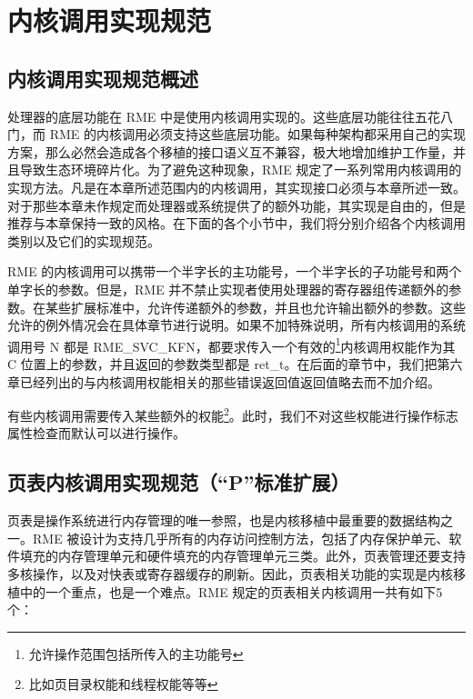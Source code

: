 \chapter{内核调用实现规范}\label{ch:kernel-call-implementation-specification}

\section{内核调用实现规范概述}\label{sec:8-kernel-call-implementation-overview}

处理器的底层功能在 RME 中是使用内核调用实现的。这些底层功能往往五花八门，而 RME 的内核调用必须支持这些底层功能。如果每种架构都采用自己的实现方案，那么必然会造成各个移植的接口语义互不兼容，极大地增加维护工作量，并且导致生态环境碎片化。为了避免这种现象，RME 规定了一系列常用内核调用的实现方法。凡是在本章所述范围内的内核调用，其实现接口必须与本章所述一致。对于那些本章未作规定而处理器或系统提供了的额外功能，其实现是自由的，但是推荐与本章保持一致的风格。在下面的各个小节中，我们将分别介绍各个内核调用类别以及它们的实现规范。

RME 的内核调用可以携带一个半字长的主功能号，一个半字长的子功能号和两个单字长的参数。但是，RME 并不禁止实现者使用处理器的寄存器组传递额外的参数。在某些扩展标准中，允许传递额外的参数，并且也允许输出额外的参数。这些允许的例外情况会在具体章节进行说明。如果不加特殊说明，所有内核调用的系统调用号 N 都是 RME\_SVC\_KFN，都要求传入一个有效的\footnote{允许操作范围包括所传入的主功能号}内核调用权能作为其 C 位置上的参数，并且返回的参数类型都是 ret\_t。在后面的章节中，我们把第六章已经列出的与内核调用权能相关的那些错误返回值返回值略去而不加介绍。

有些内核调用需要传入某些额外的权能\footnote{比如页目录权能和线程权能等等}。此时，我们不对这些权能进行操作标志属性检查而默认可以进行操作。

\section{页表内核调用实现规范（``P''标准扩展）}\label{sec:8-page-table-kernel-calls}

页表是操作系统进行内存管理的唯一参照，也是内核移植中最重要的数据结构之一。RME 被设计为支持几乎所有的内存访问控制方法，包括了内存保护单元、软件填充的内存管理单元和硬件填充的内存管理单元三类。此外，页表管理还要支持多核操作，以及对快表或寄存器缓存的刷新。因此，页表相关功能的实现是内核移植中的一个重点，也是一个难点。RME 规定的页表相关内核调用一共有如下5个：

